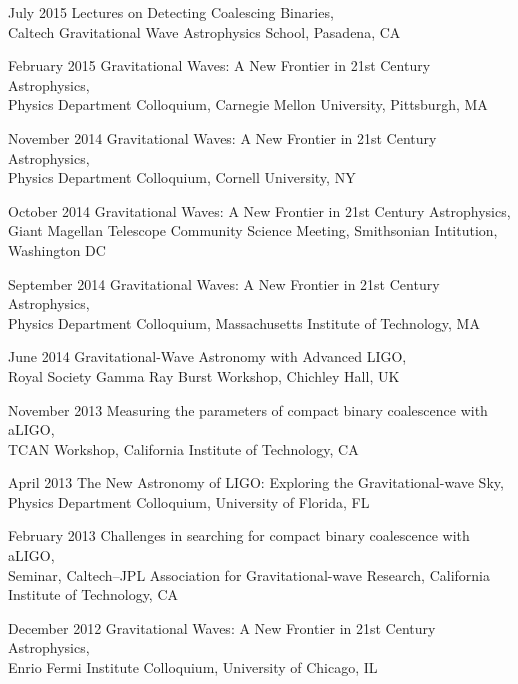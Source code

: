 \documentclass{cv}
\begin{document}
\begin{entry}
\item[July 2015] {Lectures on Detecting Coalescing Binaries},\\
{\small Caltech Gravitational Wave Astrophysics School, Pasadena, CA}

\item[February 2015] {Gravitational Waves: A New Frontier in 21st Century
Astrophysics},\\
{\small Physics Department Colloquium, Carnegie Mellon University, Pittsburgh, MA}

\item[November 2014] {Gravitational Waves: A New Frontier in 21st Century
Astrophysics},\\
{\small Physics Department Colloquium, Cornell University, NY}

\item[October 2014] {Gravitational Waves: A New Frontier in 21st Century
Astrophysics},\\
{\small Giant Magellan Telescope Community Science Meeting, Smithsonian
Intitution, Washington DC}

\item[September 2014] {Gravitational Waves: A New Frontier in 21st Century
Astrophysics},\\
{\small Physics Department Colloquium, Massachusetts Institute of Technology,
MA}

\item[June 2014] {Gravitational-Wave Astronomy with Advanced LIGO},\\
{\small Royal Society Gamma Ray Burst Workshop, Chichley Hall, UK}

\item[November 2013] {Measuring the parameters of compact binary coalescence with aLIGO},\\
{\small TCAN Workshop, California Institute of Technology, CA}

\item[April 2013] {The New Astronomy of LIGO: Exploring the
Gravitational-wave Sky},\\
{\small Physics Department Colloquium, University of Florida, FL}

\item[February 2013] {Challenges in searching for compact binary coalescence with aLIGO},\\
{\small Seminar, Caltech--JPL Association for Gravitational-wave Research, California Institute of Technology, CA}

\item[December 2012] {Gravitational Waves: A New Frontier in 21st Century
Astrophysics},\\
{\small Enrio Fermi Institute Colloquium, University of Chicago, IL}


\end{entry}
\end{document}
